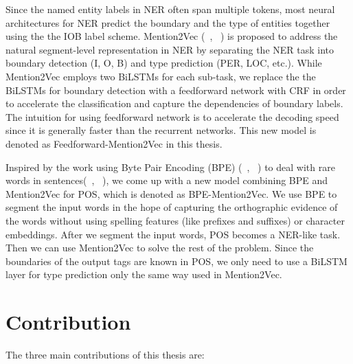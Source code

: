 \documentclass{sfuthesis}
\begin{document}
Since the named entity labels in NER often span multiple tokens, most neural architectures for NER predict the boundary and the type of entities together using the the IOB label scheme. Mention2Vec (~\citeauthor{stratos2016mention2vec}, ~\citeyear{stratos2016mention2vec}) is proposed to address the natural segment-level representation in NER by separating the NER task into boundary detection (I, O, B) and type prediction (PER, LOC, etc.). While Mention2Vec employs two BiLSTMs for each sub-task, we replace the the BiLSTMs for boundary detection with a feedforward network with CRF in order to accelerate the classification and capture the dependencies of boundary labels. The intuition for using feedforward network is to accelerate the decoding speed since it is generally faster than the recurrent networks. This new model is denoted as Feedforward-Mention2Vec in this thesis.

Inspired by the work using Byte Pair Encoding (BPE) (~\citeauthor{gage1994new}, ~\citeyear{gage1994new}) to deal with rare words in sentences(~\citeauthor{sennrich2015neural}, ~\citeyear{sennrich2015neural}), we come up with a new model combining BPE and Mention2Vec for POS, which is denoted as BPE-Mention2Vec. We use BPE to segment the input words in the hope of capturing the orthographic evidence of the words without using spelling features (like prefixes and suffixes) or character embeddings. After we segment the input words, POS becomes a NER-like task. Then we can use Mention2Vec to solve the rest of the problem. Since the boundaries of the output tags are known in POS, we only need to use a BiLSTM layer for type prediction only the same way used in Mention2Vec.

\section{Contribution}
The three main contributions of this thesis are:
\end{document}

